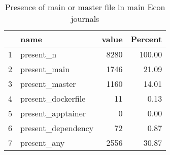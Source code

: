 \begin{table}[ht]
\centering
\caption{Presence of main or master file in main Econ journals} 
\label{tab:master}
\begin{tabular}{rlrr}
  \hline
 & name & value & Percent \\ 
  \hline
1 & present\_n & 8280 & 100.00 \\ 
  2 & present\_main & 1746 & 21.09 \\ 
  3 & present\_master & 1160 & 14.01 \\ 
  4 & present\_dockerfile &  11 & 0.13 \\ 
  5 & present\_apptainer &   0 & 0.00 \\ 
  6 & present\_dependency &  72 & 0.87 \\ 
  7 & present\_any & 2556 & 30.87 \\ 
   \hline
\end{tabular}
\end{table}
